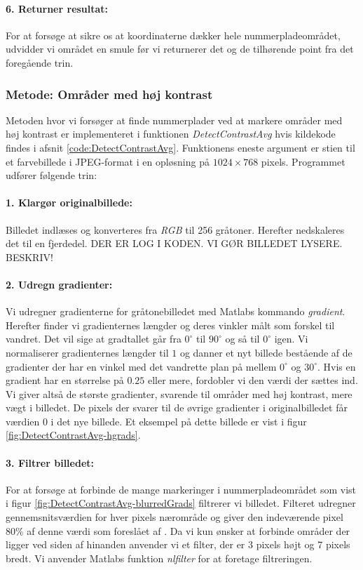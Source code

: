\paragraph{6. Returner resultat:}
For at forsøge at sikre os at koordinaterne dækker hele nummerpladeområdet, udvidder vi området en smule før vi returnerer det og de tilhørende point fra det foregående trin. 


\subsubsection{Metode: Områder med høj kontrast}
Metoden hvor vi forsøger at finde nummerplader ved at markere områder med høj kontrast er implementeret i funktionen \textit{DetectContrastAvg} hvis kildekode findes i afsnit \vref{code:DetectContrastAvg}. Funktionens eneste argument er stien til et farvebillede i JPEG-format i en opløsning på $1024 \times 768$ pixels. Programmet udfører følgende trin:

\paragraph{1. Klargør originalbillede:}
Billedet indlæses og konverteres fra \textit{RGB} til 256 gråtoner. Herefter nedskaleres det til en fjerdedel. DER ER LOG I KODEN. VI GØR BILLEDET LYSERE. BESKRIV!

\paragraph{2. Udregn gradienter:}
Vi udregner gradienterne for gråtonebilledet med Matlabs kommando \textit{gradient}. Herefter finder vi gradienternes længder og deres vinkler målt som forskel til vandret. Det vil sige at gradtallet går fra $0^\circ$ til $90^\circ$ og så til $0^\circ$ igen. Vi normaliserer gradienternes længder til $1$ og danner et nyt billede bestående af de gradienter der har en vinkel med det vandrette plan på mellem $0^\circ$ og $30^\circ$. Hvis en gradient har en størrelse på $0.25$ eller mere, fordobler vi den værdi der sættes ind. Vi giver altså de største gradienter, svarende til områder med høj kontrast, mere vægt i billedet. De pixels der svarer til de øvrige gradienter i originalbilledet får værdien $0$ i det nye billede. Et eksempel på dette billede er vist i figur \vref{fig:DetectContrastAvg-hgrads}.

\paragraph{3. Filtrer billedet:}
For at forsøge at forbinde de mange markeringer i nummerpladeområdet som vist i figur \vref{fig:DetectContrastAvg-blurredGrads} filtrerer vi billedet. Filteret udregner gennemsnitsværdien for hver pixels nærområde og giver den indeværende pixel 80\% af denne værdi som foreslået af \cite{shapiro}. Da vi kun ønsker at forbinde områder der ligger ved siden af hinanden anvender vi et filter, der er 3 pixels højt og 7 pixels bredt. Vi anvender Matlabs funktion \textit{nlfilter} for at foretage filtreringen.

